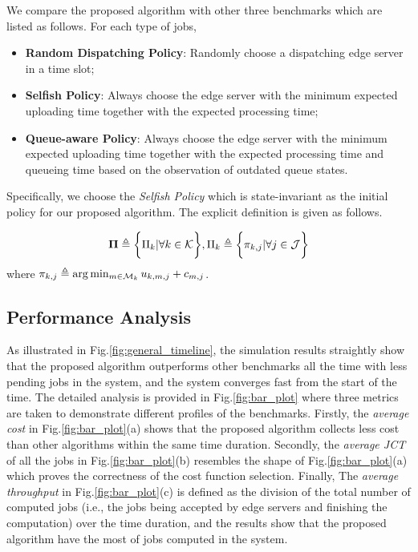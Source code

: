 We compare the proposed algorithm with other three benchmarks which are listed as follows. For each type of jobs,
\begin{itemize}
    \item \textbf{Random Dispatching Policy}:
            Randomly choose a dispatching edge server in a time slot; 
    \item \textbf{Selfish Policy}:
            Always choose the edge server with the minimum expected uploading time together with the expected processing time;
    \item \textbf{Queue-aware Policy}:
            Always choose the edge server with the minimum expected uploading time together with the expected processing time and queueing time based on the observation of outdated queue states.
\end{itemize}
Specifically, we choose the \emph{Selfish Policy} which is state-invariant as the initial policy for our proposed algorithm.
The explicit definition is given as follows.
\begin{policy}
    \begin{align}
        \boldsymbol{\Pi} \triangleq \bigg\{ \Pi_{k} |\forall k\in\mathcal{K} \bigg\}, \Pi_{k} \triangleq \bigg\{{\pi_{k,j}|\forall j\in\mathcal{J}}\bigg\}
    \end{align}
    where $\pi_{k,j} \triangleq \arg\min_{m\in\mathcal{M}_{k}} u_{k,m,j} + c_{m,j}$.
\end{policy}

\subsection{Performance Analysis}
\label{subsec:basic}
As illustrated in Fig.\ref{fig:general_timeline}, the simulation results straightly show that the proposed algorithm outperforms other benchmarks all the time with less pending jobs in the system, and the system converges fast from the start of the time.
The detailed analysis is provided in Fig.\ref{fig:bar_plot} where three metrics are taken to demonstrate different profiles of the benchmarks.
Firstly, the \emph{average cost} in Fig.\ref{fig:bar_plot}(a) shows that the proposed algorithm collects less cost than other algorithms within the same time duration.
Secondly, the \emph{average JCT} of all the jobs in Fig.\ref{fig:bar_plot}(b) resembles the shape of Fig.\ref{fig:bar_plot}(a) which proves the correctness of the cost function selection.
Finally, The \emph{average throughput} in Fig.\ref{fig:bar_plot}(c) is defined as the division of the total number of computed jobs (i.e., the jobs being accepted by edge servers and finishing the computation) over the time duration, and the results show that the proposed algorithm have the most of jobs computed in the system.

